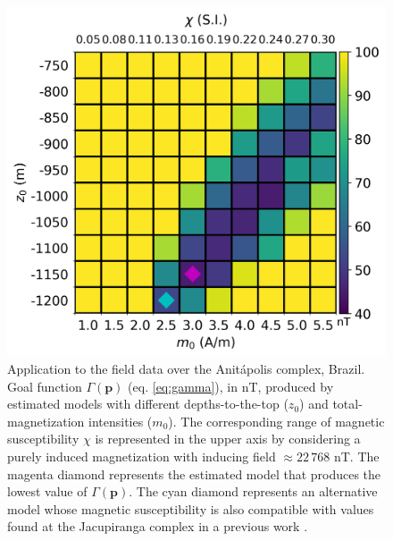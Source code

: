 \begin{figure}
	\centering
	\includegraphics[scale=.75]{figures/real_gamma.png}
	\caption{Application to the field data over the Anit{\'a}polis complex, Brazil. 
	Goal function $\Gamma(\mathbf{p})$ (eq. \ref{eq:gamma}), in nT,  
	produced by estimated models with different depths-to-the-top ($ z_0 $) and 
	total-magnetization intensities ($ m_0 $).
	The corresponding range of magnetic susceptibility $\chi$ is represented in the 
	upper axis by considering a purely induced magnetization with inducing field 
	$\approx 22 \, 768 $ nT.
	The magenta diamond represents the estimated model that produces the lowest value of $ \Gamma(\mathbf{p})$.
	The cyan diamond represents an alternative model whose magnetic susceptibility 
	is also compatible with values found at the Jacupiranga complex in a previous work 
	\citep[][ tb. 1]{valdivia-2009}.}
	\label{fig:real_map}
\end{figure}

